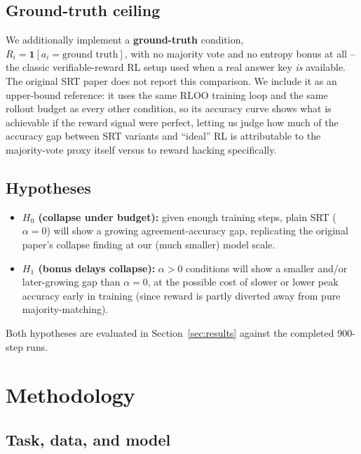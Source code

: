 \documentclass{article}
\begin{document}
\subsection{Ground-truth ceiling}

We additionally implement a \textbf{ground-truth} condition,
$R_i = \mathbf{1}[a_i = \text{ground truth}]$, with no majority vote and no
entropy bonus at all -- the classic verifiable-reward RL setup used when a
real answer key \emph{is} available. The original SRT paper does not report
this comparison. We include it as an upper-bound reference: it uses the same
RLOO training loop and the same rollout budget as every other condition, so
its accuracy curve shows what is achievable if the reward signal were
perfect, letting us judge how much of the accuracy gap between SRT variants
and ``ideal'' RL is attributable to the majority-vote proxy itself versus to
reward hacking specifically.

\subsection{Hypotheses}

\begin{itemize}
  \item \textbf{$H_0$ (collapse under budget):} given enough training steps,
  plain SRT ($\alpha{=}0$) will show a growing agreement-accuracy gap,
  replicating the original paper's collapse finding at our (much smaller)
  model scale.
  \item \textbf{$H_1$ (bonus delays collapse):} $\alpha > 0$ conditions will
  show a smaller and/or later-growing gap than $\alpha{=}0$, at the possible
  cost of slower or lower peak accuracy early in training (since reward is
  partly diverted away from pure majority-matching).
\end{itemize}
Both hypotheses are evaluated in Section~\ref{sec:results} against the
completed 900-step runs.


\section{Methodology}
\label{sec:methodology}

\subsection{Task, data, and model}
\end{document}
